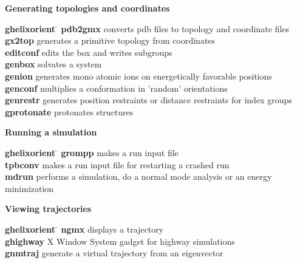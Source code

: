 \begin{description}
\item {\large\bf Generating topologies and coordinates}
\vspace{-2ex}\begin{tabbing}
{\bf g\us{}helixorient} \= \kill
{\bf pdb2gmx} \> converts pdb files to topology and coordinate files \\
{\bf g\us{}x2top} \> generates a primitive topology from coordinates  \\
{\bf editconf} \> edits the box and writes subgroups  \\
{\bf genbox} \> solvates a system \\
{\bf genion} \> generates mono atomic ions on energetically favorable positions \\
{\bf genconf} \> multiplies a conformation in 'random' orientations \\
{\bf genrestr} \> generates position restraints or distance restraints for index groups \\
{\bf g\us{}protonate} \> protonates structures \\
\end{tabbing}\vspace{-2ex}

\item {\large\bf Running a simulation}
\vspace{-2ex}\begin{tabbing}
{\bf g\us{}helixorient} \= \kill
{\bf grompp} \> makes a run input file \\
{\bf tpbconv} \> makes a run input file for restarting a crashed run \\
{\bf mdrun} \> performs a simulation, do a normal mode analysis or an energy minimization \\
\end{tabbing}\vspace{-2ex}

\item {\large\bf Viewing trajectories}
\vspace{-2ex}\begin{tabbing}
{\bf g\us{}helixorient} \= \kill
{\bf ngmx} \> displays a trajectory \\
{\bf g\us{}highway} \> X Window System gadget for highway simulations \\
{\bf g\us{}nmtraj} \> generate a virtual trajectory from an eigenvector \\
\end{tabbing}\vspace{-2ex}


\end{description}
